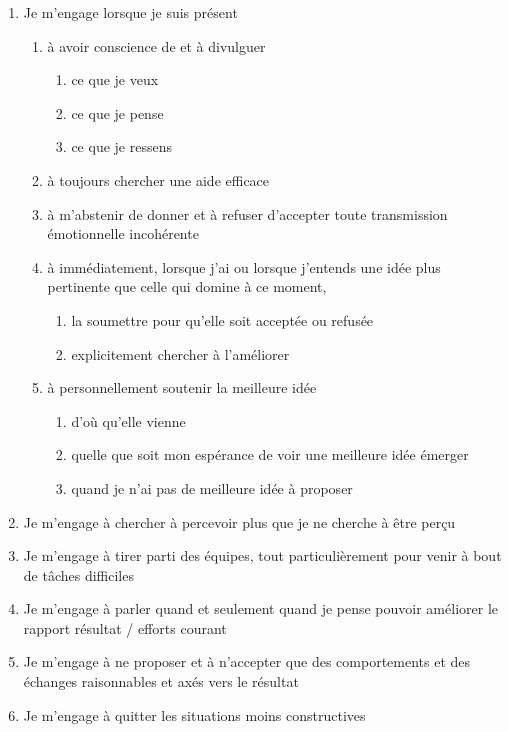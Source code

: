 \documentclass{book}
\begin{document}
\begin{enumerate}
	\item Je m'engage lorsque je suis présent
	\begin{enumerate}
		\item à avoir conscience de et à divulguer
		\begin{enumerate}		
			\item ce que je veux
			\item ce que je pense
			\item ce que je ressens
		\end{enumerate}
		\item à toujours chercher une aide efficace
		\item à m'abstenir de donner et à refuser d'accepter toute transmission émotionnelle incohérente
		\item à immédiatement, lorsque j'ai ou lorsque j'entends une idée plus pertinente que celle qui domine 
		      à ce moment, 
		\begin{enumerate}		
			\item la soumettre pour qu'elle soit acceptée ou refusée
			\item explicitement chercher à l'améliorer
		\end{enumerate}
		\item à personnellement soutenir la meilleure idée
		\begin{enumerate}		
			\item d'où qu'elle vienne
			\item quelle que soit mon espérance de voir une meilleure idée émerger
			\item quand je n'ai pas de meilleure idée à proposer
		\end{enumerate}
	\end{enumerate}
	\item Je m'engage à chercher à percevoir plus que je ne cherche à être perçu
	\item Je m'engage à tirer parti des équipes, tout particulièrement pour venir à bout de tâches difficiles
	\item Je m'engage à parler quand et seulement quand je pense pouvoir améliorer le rapport résultat / efforts courant
	\item Je m'engage à ne proposer et à n'accepter que des comportements et des échanges raisonnables et axés vers le résultat
	\item Je m'engage à quitter les situations moins constructives
	\begin{enumerate}

\end{enumerate}
\end{enumerate}
\end{document}
